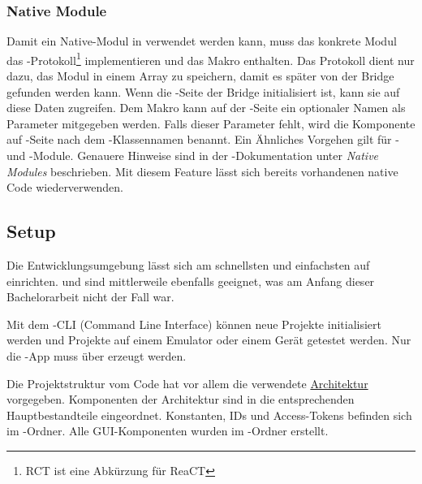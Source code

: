\subsubsection{Native Module}
Damit ein  Native-Modul in  verwendet werden kann, muss das konkrete Modul das \newline{}-Protokoll\footnote{RCT ist eine Abkürzung für ReaCT} implementieren und das Makro \newline{} enthalten. 
Das Protokoll dient nur dazu, das Modul in einem Array zu speichern, damit es später von der Bridge gefunden werden kann. 
Wenn die -Seite der Bridge initialisiert ist, kann sie auf diese Daten zugreifen. 
Dem Makro kann auf der -Seite ein optionaler Namen als Parameter mitgegeben werden. 
Falls dieser Parameter fehlt, wird die Komponente auf -Seite nach dem -Klassennamen benannt. 
Ein Ähnliches Vorgehen gilt für - und -Module. 
Genauere Hinweise sind in der -Dokumentation unter \textit{Native Modules} beschrieben.\cite{react-native-module-ios}\cite{react-native-module-android}
Mit diesem Feature lässt sich bereits vorhandenen native Code wiederverwenden. 


\subsection{Setup}
Die Entwicklungsumgebung lässt sich am schnellsten und einfachsten auf  einrichten. 
 und  sind mittlerweile ebenfalls geeignet, was am Anfang dieser Bachelorarbeit nicht der Fall war. 

Mit dem -CLI (Command Line Interface) können neue Projekte initialisiert werden und Projekte auf einem Emulator oder einem Gerät getestet werden. 
Nur die -App muss über  erzeugt werden. 

Die Projektstruktur vom  Code hat vor allem die verwendete \hyperref[pd-architektur]{Architektur} vorgegeben. 
Komponenten der Architektur sind in die entsprechenden Hauptbestandteile eingeordnet. 
Konstanten, IDs und Access-Tokens befinden sich im -Ordner. 
Alle \gls{GUI}-Komponenten wurden im -Ordner erstellt. 


